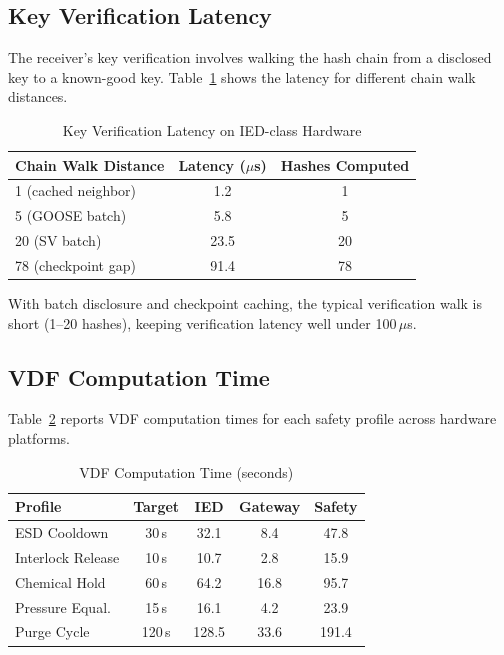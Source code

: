 \documentclass[conference,10pt]{IEEEtran}
\begin{document}
\subsection{Key Verification Latency}

The receiver's key verification involves walking the hash chain from a disclosed key to a known-good key. Table~\ref{tab:key_verify} shows the latency for different chain walk distances.

\begin{table}[t]
\centering
\caption{Key Verification Latency on IED-class Hardware}
\label{tab:key_verify}
\begin{tabular}{@{}lcc@{}}
\toprule
\textbf{Chain Walk Distance} & \textbf{Latency ($\mu$s)} & \textbf{Hashes Computed} \\
\midrule
1 (cached neighbor)    & 1.2   & 1 \\
5 (GOOSE batch)        & 5.8   & 5 \\
20 (SV batch)          & 23.5  & 20 \\
78 (checkpoint gap)    & 91.4  & 78 \\
\bottomrule
\end{tabular}
\end{table}

With batch disclosure and checkpoint caching, the typical verification walk is short (1--20 hashes), keeping verification latency well under 100\,$\mu$s.

\subsection{VDF Computation Time}

Table~\ref{tab:vdf_compute} reports VDF computation times for each safety profile across hardware platforms.

\begin{table}[t]
\centering
\caption{VDF Computation Time (seconds)}
\label{tab:vdf_compute}
\begin{tabular}{@{}lcccc@{}}
\toprule
\textbf{Profile} & \textbf{Target} & \textbf{IED} & \textbf{Gateway} & \textbf{Safety} \\
\midrule
ESD Cooldown      & 30\,s  & 32.1  & 8.4   & 47.8 \\
Interlock Release & 10\,s  & 10.7  & 2.8   & 15.9 \\
Chemical Hold     & 60\,s  & 64.2  & 16.8  & 95.7 \\
Pressure Equal.   & 15\,s  & 16.1  & 4.2   & 23.9 \\
Purge Cycle       & 120\,s & 128.5 & 33.6  & 191.4 \\
\bottomrule
\end{tabular}
\end{table}
\end{document}
